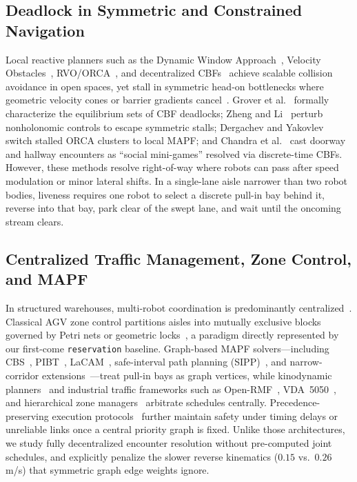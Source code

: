 \documentclass[letterpaper,journal]{IEEEtran}
\begin{document}
\subsection{Deadlock in Symmetric and Constrained Navigation}
Local reactive planners such as the Dynamic Window Approach~\cite{fox1997dwa}, Velocity Obstacles~\cite{fiorini1998motion}, RVO/ORCA~\cite{vandenberg2011orca}, and decentralized CBFs~\cite{wang2017safety} achieve scalable collision avoidance in open spaces, yet stall in symmetric head-on bottlenecks where geometric velocity cones or barrier gradients cancel~\cite{grover2023before}. Grover et al.~\cite{grover2023before} formally characterize the equilibrium sets of CBF deadlocks; Zheng and Li~\cite{zheng2023deadlock} perturb nonholonomic controls to escape symmetric stalls; Dergachev and Yakovlev~\cite{dergachev2021distributed} switch stalled ORCA clusters to local MAPF; and Chandra et al.~\cite{chandra2025deadlock,chandra2026social} cast doorway and hallway encounters as ``social mini-games'' resolved via discrete-time CBFs. However, these methods resolve right-of-way where robots can pass after speed modulation or minor lateral shifts. In a single-lane aisle narrower than two robot bodies, liveness requires one robot to select a discrete pull-in bay behind it, reverse into that bay, park clear of the swept lane, and wait until the oncoming stream clears.

\subsection{Centralized Traffic Management, Zone Control, and MAPF}
In structured warehouses, multi-robot coordination is predominantly centralized~\cite{fragapane2021planning}. Classical AGV zone control partitions aisles into mutually exclusive blocks governed by Petri nets or geometric locks~\cite{fanti2002event}, a paradigm directly represented by our first-come \texttt{reservation} baseline. Graph-based MAPF solvers---including CBS~\cite{sharon2015cbs}, PIBT~\cite{okumura2022pibt}, LaCAM~\cite{okumura2023lacam}, safe-interval path planning (SIPP)~\cite{phillips2011sipp}, and narrow-corridor extensions~\cite{experience2024narrow,macga2025}---treat pull-in bays as graph vertices, while kinodynamic planners~\cite{wen2022clmapf,dbecbs2025} and industrial traffic frameworks such as Open-RMF~\cite{openrmf}, VDA~5050~\cite{vda5050}, and hierarchical zone managers~\cite{hiertraffic2023} arbitrate schedules centrally. Precedence-preserving execution protocols~\cite{cap2016provably,mannucci2019provably} further maintain safety under timing delays or unreliable links once a central priority graph is fixed. Unlike those architectures, we study fully decentralized encounter resolution without pre-computed joint schedules, and explicitly penalize the slower reverse kinematics ($0.15$ vs.\ $0.26$\,m/s) that symmetric graph edge weights ignore.
\end{document}
